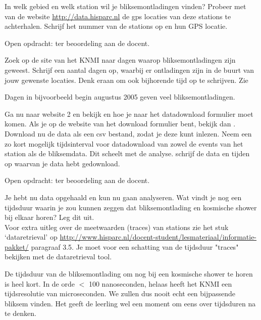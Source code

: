 \begin{questions}
\question 
In welk gebied en welk station wil je bliksemontladingen vinden? Probeer met 
van de website \url{http://data.hisparc.nl} de gps locaties van deze stations te 
achterhalen. Schrijf het nummer van de stations op en hun GPS locatie.
\begin{solution}
  Open opdracht: ter beoordeling aan de docent.
\end{solution}

\question 
Zoek op de site van het KNMI naar dagen waarop bliksemontladingen zijn geweest.
Schrijf een aantal dagen op, waarbij er ontladingen zijn in de buurt van jouw gewenste
locaties. Denk eraan om ook bijhorende tijd op te schrijven. Zie 
\begin{solution}
   Dagen in bijvoorbeeld begin augustus 2005 geven veel bliksemontladingen.
\end{solution}

\question 
Ga nu naar website 2 en bekijk  en 
hoe je naar het datadownload formulier moet komen. 
Als je op de website van het download formulier bent, bekijk dan .
Download nu de data als een csv bestand, zodat je deze kunt inlezen. Neem een zo kort mogelijk tijdsinterval
voor datadownload van zowel de events van het \hisparc station als de bliksemdata.
Dit scheelt met de analyse. schrijf de data en tijden op waarvan je data hebt gedownload.
\begin{solution}
  Open opdracht: ter beoordeling aan de docent.
\end{solution}

\question 
Je hebt nu data opgehaald en kun nu gaan analyseren.
Wat vindt je nog een tijdsduur waarin je zou kunnen zeggen dat bliksemontlading
en kosmische shower bij elkaar horen? Leg dit uit. \\
\small{Voor extra uitleg over de meetwaarden (traces) van \hisparc stations zie het stuk `dataretrieval' 
op \url{ http://www.hisparc.nl/docent-student/lesmateriaal/informatie-pakket/} paragraaf 3.5.
Je moet voor een schatting van de tijdsduur "traces" bekijken met de dataretrieval tool.}
\begin{solution}
  De tijdsduur van de bliksemontlading om nog bij een kosmische shower te horen 
  is heel kort. In de orde $<$ 100 nanoseconden, helaas heeft het KNMI een tijdsresolutie
  van microseconden. We zullen dus nooit echt een bijpassende bliksem vinden.
  Het geeft de leerling wel een moment om eens over tijdsduren na te denken.
\end{solution}


\end{questions}
